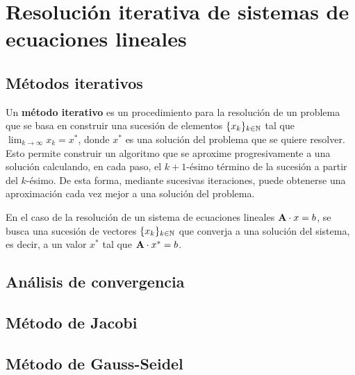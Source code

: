 
\section{Resolución iterativa de sistemas de ecuaciones lineales}
\subsection{Métodos iterativos}
Un \textbf{método iterativo} es un procedimiento para la resolución de un
problema que se basa en construir una sucesión de elementos $\lbrace x_k
\rbrace_{k \in \mathbb{N}}$ tal que $\lim_{k\to\infty} x_k = x^\ast$, donde $x^\ast$
es una solución del problema que se quiere resolver.
Esto permite construir un algoritmo que se aproxime progresivamente a una
solución calculando, en cada paso, el $k+1$-ésimo término de la sucesión a
partir del $k$-ésimo. De esta forma, mediante sucesivas iteraciones, puede
obtenerse una aproximación cada vez mejor a una solución del problema.

En el caso de la resolución de un sistema de ecuaciones lineales $\mathbf{A}
\cdot x = b$, se busca una sucesión de vectores $\lbrace x_k \rbrace_{k \in
\mathbb{N}}$ que converja a una solución del sistema, es decir, a un valor $x^\ast$
tal que $\mathbf{A} \cdot x^\ast = b$.

\subsection{Análisis de convergencia}
\subsection{Método de Jacobi}
\subsection{Método de Gauss-Seidel}

